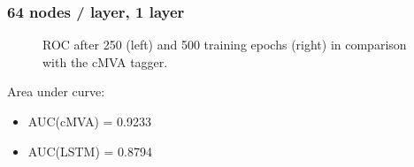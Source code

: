 \documentclass{beamer}
\begin{document}
\begin{frame}
  \frametitle{64 nodes / layer, 1 layer}
    \begin{figure}[htb]
    \centering

    \caption{ROC after 250 (left) and 500 training epochs (right) in comparison with the cMVA tagger.}
    \end{figure}

  Area under curve:
  \begin{itemize}
  \item AUC(cMVA) = 0.9233
  \item AUC(LSTM) = 0.8794
  \end{itemize}

\end{frame}
\end{document}
